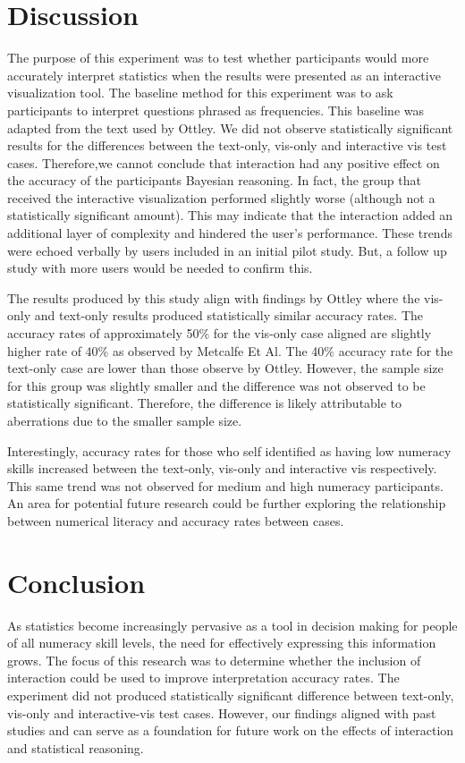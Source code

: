 \section{Discussion}
The purpose of this experiment was to test whether participants would more
accurately interpret statistics when the results were presented as an
interactive visualization tool. The baseline method for this experiment was
to ask participants to interpret questions phrased as frequencies. This
baseline was adapted from the text used by Ottley. We did not observe
statistically significant results for the differences between the text-only,
vis-only and interactive vis test cases. Therefore,we cannot conclude that
interaction had any positive effect on the accuracy of the participants
Bayesian reasoning. In fact, the group that received the interactive
visualization performed slightly worse (although not a statistically
significant amount). This may indicate that the interaction added an
additional layer of complexity and hindered the user's performance. These
trends were echoed verbally by users included in an initial pilot study. But,
a follow up study with more users would be needed to confirm this.

The results produced by this study align with findings by Ottley where the
vis-only and text-only results produced statistically similar accuracy rates.
The accuracy rates of approximately 50\% for the vis-only case aligned are
slightly higher rate of 40\% as observed by Metcalfe Et Al. The 40\% accuracy
rate for the text-only case are lower than those observe by Ottley. However,
the sample size for this group was slightly smaller and the difference was
not observed to be statistically significant. Therefore, the difference is
likely attributable to aberrations due to the smaller sample size.

Interestingly, accuracy rates for those who self identified as having low
numeracy skills increased between the text-only, vis-only and interactive vis
respectively. This same trend was not observed for medium and high numeracy
participants. An area for potential future research could be further
exploring the relationship between numerical literacy and accuracy rates
between cases.


\section{Conclusion}
\label{sec:conclusion}
As statistics become increasingly pervasive as a tool in decision making for
people of all numeracy skill levels, the need for effectively expressing this
information grows. The focus of this research was to determine whether the
inclusion of interaction could be used to improve interpretation accuracy
rates. The experiment did not produced statistically significant difference
between text-only, vis-only and interactive-vis test cases. However, our
findings aligned with past studies and can serve as a foundation for future
work on the effects of interaction and statistical reasoning.